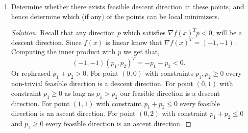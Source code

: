 \documentclass[12pt]{article}
\makeatletter
\theoremstyle{homework}
\newenvironment{exercise}[1]
{\def\@currentlabel{#1}\exercisecore}
{\endexercisecore}
\makeatother
\begin{document}
\begin{exercise}{4.3}
\begin{enumerate}
  \item Determine whether there exists feasible descent direction at these points, and hence 
  determine which (if any) of the points can be local minimizers.
  \begin{proof}[Solution] Recall that any direction $p$ which satisfies $\nabla f(x)^{T}p < 0$, will be a descent direction.
    Since $f(x)$ is linear know that  $\nabla f(x)^{T} = (-1, -1)$. Computing the inner product with $p$ we get that, 
    \begin{equation*}
      (-1, -1)(p_1, p_2)^T = -p_1 - p_2 < 0. 
    \end{equation*}
    Or rephrased $p_1 + p_2 > 0$. For point $(0, 0)$ with constraints $p_1, p_2 \geq 0$ every non-trivial feasible direction is a descent direction. 
    For point $(0, 1)$ with constraint $p_1 \geq 0$ as long as $p_1 > p_2$ our feasible direction is a descent direction. 
    For point $(1, 1)$ with constraint $p_1 + p_2 \leq 0$ every feasible direction is an ascent direction. 
    For point $(0, 2)$ with constraint $p_1 + p_2 \leq 0$ and $p_1 \geq 0$ every feasible direction is an ascent direction. 
  \end{proof}
\end{enumerate}
\end{exercise}
\vspace{.5in}
\end{document}
